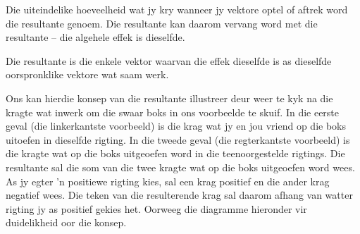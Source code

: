 \label{m38813*id188345}Die uiteindelike hoeveelheid wat jy kry wanneer jy vektore optel of aftrek word die resultante genoem. Die resultante kan daarom vervang word met die resultante – die algehele effek is dieselfde.\\

 {Die resultante is die enkele vektor waarvan die effek dieselfde is as dieselfde oorspronklike vektore wat saam werk. } 

Ons kan hierdie konsep van die resultante illustreer deur weer te kyk na die kragte wat inwerk om die swaar boks in ons voorbeelde te skuif. In die eerste geval (die linkerkantste voorbeeld) is die krag wat jy en jou vriend op die boks uitoefen in dieselfde rigting. In die tweede geval (die regterkantste voorbeeld) is die kragte wat op die boks uitgeoefen word in die teenoorgestelde rigtings. Die resultante sal die som van die twee kragte wat op die boks uitgeoefen word wees. As jy egter  'n positiewe rigting kies, sal een krag positief en die ander krag negatief wees. Die teken van die resulterende krag sal daarom afhang van watter rigting jy as positief gekies het. Oorweeg die diagramme hieronder vir duidelikheid oor die konsep.\\

